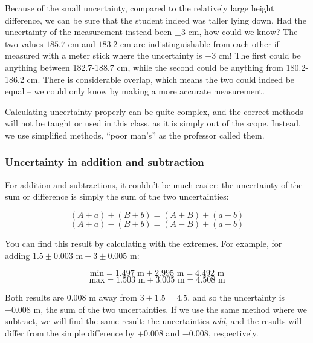 \documentclass[12pt,a4paper]{report}
\begin{document}
Because of the small uncertainty, compared to the relatively large height difference, we can be sure that the student indeed was taller lying down. Had the uncertainty of the measurement instead been $\pm 3$ cm, how could we know? The two values $185.7$ cm and $183.2$ cm are indistinguishable from each other if measured with a meter stick where the uncertainty is $\pm 3$ cm! The first could be anything between 182.7-188.7 cm, while the second could be anything from 180.2-186.2 cm. There is considerable overlap, which means the two could indeed be equal -- we could only know by making a more accurate measurement.

Calculating uncertainty properly can be quite complex, and the correct methods will not be taught or used in this class, as it is simply out of the scope. Instead, we use simplified methods, ``poor man's'' as the professor called them.

\subsubsection{Uncertainty in addition and subtraction}

For addition and subtractions, it couldn't be much easier: the uncertainty of the sum or difference is simply the sum of the two uncertainties:

\begin{equation}
 (A \pm a) + (B \pm b) = (A + B) \pm (a +b)
\end{equation}
\begin{equation}
 (A \pm a) - (B \pm b) = (A - B) \pm (a +b)
\end{equation}

You can find this result by calculating with the extremes. For example, for adding $1.5 \pm 0.003 \text{ m} + 3 \pm 0.005 \text{ m}$:

\begin{equation}
\text{min} = 1.497 \text{ m} + 2.995 \text{ m} = 4.492 \text{ m}
\end{equation}
\begin{equation}
\text{max} = 1.503 \text{ m} + 3.005 \text{ m} = 4.508 \text{ m}
\end{equation}

Both results are $0.008$ m away from $3 + 1.5 = 4.5$, and so the uncertainty is $\pm 0.008$ m, the sum of the two uncertainties.  
If we use the same method where we subtract, we will find the same result: the uncertainties \emph{add}, and the results will differ from the simple difference by $+0.008$ and $-0.008$, respectively.
\end{document}
